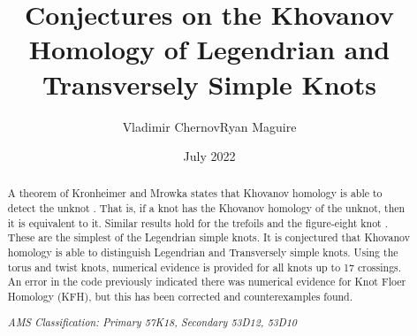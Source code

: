 \documentclass{article}
\title{Conjectures on the Khovanov Homology of Legendrian and Transversely Simple Knots}
\author{Vladimir Chernov\hspace{2em}Ryan Maguire}
\date{July 2022}
\theoremstyle{plain}
\begin{document}
    \maketitle
    \tableofcontents
    \begin{abstract}
        \noindent
        A theorem of Kronheimer and Mrowka states that Khovanov homology is
        able to detect the unknot \cite{kronheimermrowka2010}.
        That is, if a knot has the Khovanov homology of the unknot, then it is
        equivalent to it. Similar results hold for the trefoils
        \cite{BaldwinSivekKhovanovTrefoils} and the figure-eight knot
        \cite{BaldwinDowlinKhovanovFigureEight}. These are the
        simplest of the Legendrian simple knots. It is conjectured that
        Khovanov homology is able to distinguish Legendrian and Transversely simple
        knots. Using the torus and twist knots, numerical evidence is provided
        for all knots up to 17 crossings. An error in the code previously
        indicated there was numerical evidence for Knot Floer Homology (KFH),
        but this has been corrected and counterexamples found.
        \par\hfill\par
        \textit{AMS Classification: Primary 57K18, Secondary 53D12, 53D10}
    \end{abstract}
\end{document}
